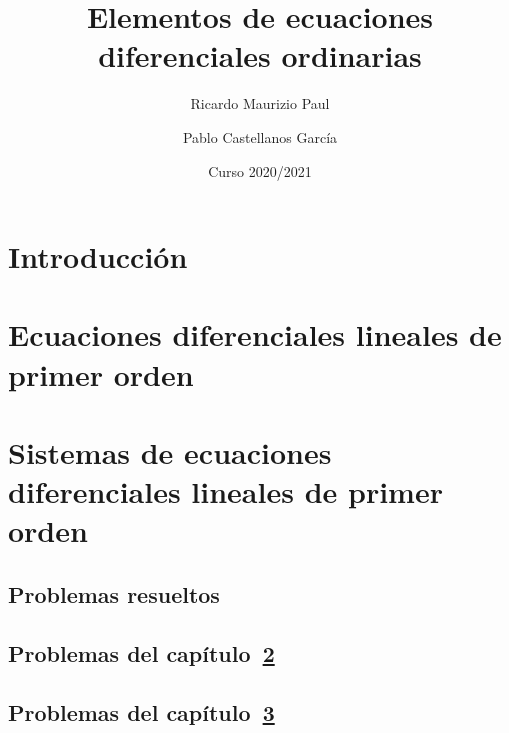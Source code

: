 \documentclass{report}
\title{Elementos de ecuaciones diferenciales ordinarias}
\author{Ricardo Maurizio Paul \and Pablo Castellanos García}
\date{Curso 2020/2021}
\begin{document}
\maketitle
\tableofcontents

\setcounter{chapter}{-1}
\chapter{Introducción}


\chapter{Ecuaciones diferenciales lineales de primer orden}
\label{chap:capitulo1}


\chapter{Sistemas de ecuaciones diferenciales lineales de primer orden}
\label{chap:capitulo2}


\begin{appendices}

\chapter{Problemas resueltos}

\section{Problemas del capítulo~\ref{chap:capitulo1}}


\section{Problemas del capítulo~\ref{chap:capitulo2}}


\end{appendices}
\end{document}
